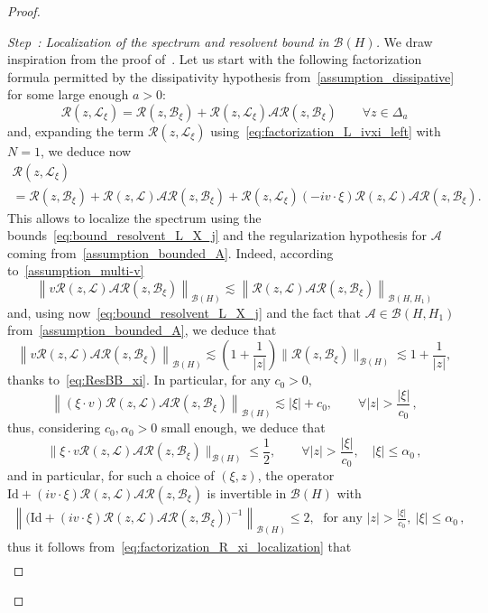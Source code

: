 \documentclass[10pt]{amsart}
\theoremstyle{definition}\newtheorem{defi}[theo]{Definition}\newtheorem{rema}[theo]{Remark}\newtheorem{exam}[theo]{Example}\newtheorem{exem}[theo]{Example}\newtheorem{nota}[theo]{Notation}
\newcommand{\Id}{\mathrm{Id}}
\renewcommand{\AA}{\mathcal{A}}
\newcommand{\BB}{\mathcal{B}}
\newcommand{\LL}{\mathcal{L}}
\newcommand{\RR}{\mathcal{R}}
\newcommand{\BBB}{\mathscr{B}}
\newcommand{\Ss}{H}
\renewcommand*\le{\leqslant}
\renewcommand*\leq{\leqslant}
\newcounter{stepcount}
\newenvironment{step}[1]{\refstepcounter{stepcount}\begin{proof}[Step~\thestepcount: #1]}{\let\qed\relax\end{proof}}
\let\oldforall\forall
\renewcommand*{\forall}{\mathrel{\oldforall}}
\begin{document}
\begin{proof}
\begin{step}{{Localization of the spectrum and resolvent bound in $\BBB(\Ss)$}}
We draw inspiration from the proof of~\cite[Lemma~2.16]{T2016}. Let us start with the following factorization formula permitted by the dissipativity hypothesis from~\eqref{assumption_dissipative} for some large enough $a > 0$:
\[
\RR(z,\LL_{\xi}) = \RR(z,\BB_{\xi}) + \RR(z,\LL_{\xi}) \AA \RR(z,\BB_{\xi}) \qquad \forall z \in \Delta_{a}
\]
and, expanding the term $\RR(z,\LL_{\xi})$ using~\eqref{eq:factorization_L_ivxi_left} with $N = 1$, we deduce now
\begin{multline}\label{eq:factorization_R_xi_localization}
\RR(z,\LL_{\xi}) \\
=  \RR(z,\BB_{\xi}) + \RR(z,\LL) \AA \RR(z,\BB_{\xi}) + \RR(z,\LL_{\xi}) (- i v \cdot \xi) \RR(z,\LL) \AA \RR(z,\BB_{\xi}).
\end{multline}
This allows to localize the spectrum using the bounds~\eqref{eq:bound_resolvent_L_X_j} and the regularization hypothesis for $\AA$ coming from~\eqref{assumption_bounded_A}. Indeed, according to~\eqref{assumption_multi-v}
\[
\left\|v \RR(z,\LL) \AA \RR(z,\BB_{\xi}) \right\|_{\BBB(\Ss)} \lesssim \left\|\RR(z,\LL)\AA\RR(z,\BB_{\xi})\right\|_{\BBB(\Ss,\Ss_{1})}
\]
and, using now~\eqref{eq:bound_resolvent_L_X_j} and the fact that $\AA \in \BBB(\Ss,\Ss_{1})$ from~\eqref{assumption_bounded_A}, we deduce that
\[
\left\|v \RR(z,\LL) \AA \RR(z,\BB_{\xi}) \right\|_{\BBB(\Ss)} \lesssim \left(1+\frac{1}{|z|}\right)\|\RR(z,\BB_{\xi})\|_{\BBB(\Ss)} \lesssim 1+\frac{1}{|z|},
\]
thanks to~\eqref{eq:ResBB_xi}. In particular, for any $c_0 >0,$
\[
\left\|\left(\xi \cdot v\right)\RR(z,\LL) \AA \RR(z,\BB_{\xi}) \right\|_{\BBB(\Ss)} \lesssim |\xi|+c_0, \qquad \forall | z | > \frac{| \xi |}{c_0}\,,
\]
thus, considering $c_0, \alpha_{0} > 0$ small enough, we deduce that
\[
\| \xi \cdot v \RR(z,\LL) \AA \RR(z,\BB_{\xi}) \|_{\BBB(\Ss)} \le \frac{1}{2}, \qquad \forall |z| > \frac{|\xi|}{c_0}, \quad | \xi | \le \alpha_0\,,
\]
and in particular, for such a choice of $(\xi, z)$, the operator $\Id + (i v \cdot \xi) \RR(z,\LL) \AA\RR(z,\BB_{\xi})$ is invertible in $\BBB(\Ss)$ with
\begin{multline}\label{eq:inverseId}
\left\|\Big(\Id + (i v \cdot \xi) \RR(z,\LL) \AA\RR(z,\BB_{\xi}) \Big)^{-1}\right\|_{\BBB(\Ss)} \leq 2,\;
\text{ for any } |z| > \frac{|\xi|}{c_0},~|\xi | \le \alpha_0\,,
\end{multline}
thus it follows from~\eqref{eq:factorization_R_xi_localization} that
\begin{align*}

\end{align*}
\end{step}
\end{proof}
\end{document}
